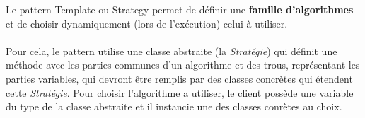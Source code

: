 \item{}
{\vrai}
{Le pattern Template ou Strategy permet de définir une \textbf{famille d'algorithmes} et de choisir dynamiquement (lors de l'exécution) celui à utiliser.
\paragraph{}
Pour cela, le pattern utilise une classe abstraite (la \textit{Stratégie}) qui définit une méthode avec les parties communes d'un algorithme et des trous, représentant les parties variables, qui devront être remplis par des classes concrètes qui étendent cette \textit{Stratégie}. Pour choisir l'algorithme a utiliser, le client possède une variable du type de la classe abstraite et il instancie une des classes conrètes au choix.
}


\item{}
{}
{}


\item{}
{}
{}


\item{}
{}
{}


\item{}
{}
{}